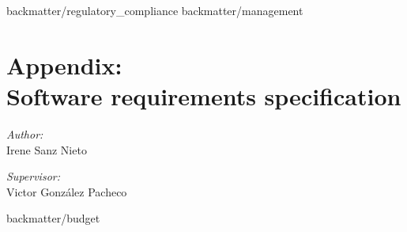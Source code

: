 \begin{appendices}

	 {backmatter/regulatory_compliance}
	 {backmatter/management}

	\chapter{Appendix: \\Software requirements specification}
		\label{requirements}
		\begin{minipage}{0.55\textwidth}
		\begin{flushleft} \large
		\emph{Author:}\\
		Irene Sanz Nieto\\
		\end{flushleft}
		\end{minipage}
		\begin{minipage}{0.4\textwidth}
		\begin{flushright} \large
		\emph{Supervisor:}\\
		Victor González Pacheco\end{flushright}\end{minipage}\vfill
		


	 {backmatter/budget}


\end{appendices}